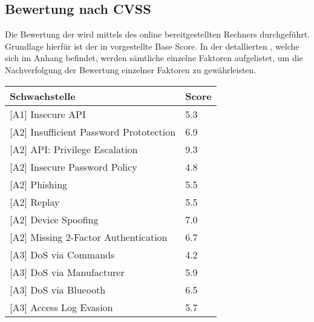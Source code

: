 \subsection{Bewertung nach CVSS}
\label{sec:analysis_cvss}
    Die Bewertung der  wird mittels des online bereitgestellten Rechners\cite{CvssCalc} durchgeführt.
	Grundlage hierfür ist der in  vorgestellte Base Score.
	In der detallierten , welche sich im Anhang befindet, werden sämtliche einzelne Faktoren aufgelistet, um die Nachverfolgung der Bewertung einzelner Faktoren zu gewährleisten.

    \begin{table}[H]
        \centering
        \sffamily
        \begin{tabular}{|l|l|}
        \hline
\textbf{Schwachstelle}                      & \textbf{Score} \\ \hline
\rowcolor{light-gray}
{[}A1{]} Insecure API                       & \cellcolor{orange}5.3            \\ \hline
{[}A2{]} Insufficient Password Prototection & \cellcolor{orange}6.9            \\ \hline
\rowcolor{light-gray}
{[}A2{]} API: Privilege Escalation          & \cellcolor{red}9.3            \\ \hline
{[}A2{]} Insecure Password Policy           & \cellcolor{orange}4.8            \\ \hline
\rowcolor{light-gray}
{[}A2{]} Phishing                           & \cellcolor{orange}5.5            \\ \hline
{[}A2{]} Replay                             & \cellcolor{orange}5.5            \\ \hline
\rowcolor{light-gray}
{[}A2{]} Device Spoofing                    & \cellcolor{redorange}7.0            \\ \hline
{[}A2{]} Missing 2-Factor Authentication    & \cellcolor{orange}6.7            \\ \hline
\rowcolor{light-gray}
{[}A3{]} DoS via Commands                   & \cellcolor{orange}4.2            \\ \hline
{[}A3{]} DoS via Manufacturer               & \cellcolor{orange}5.9            \\ \hline
\rowcolor{light-gray}
{[}A3{]} DoS via Blueooth                   & \cellcolor{orange}6.5            \\ \hline
{[}A3{]} Access Log Evasion                 & \cellcolor{orange}5.7            \\ \hline

\end{tabular}
\end{table}
